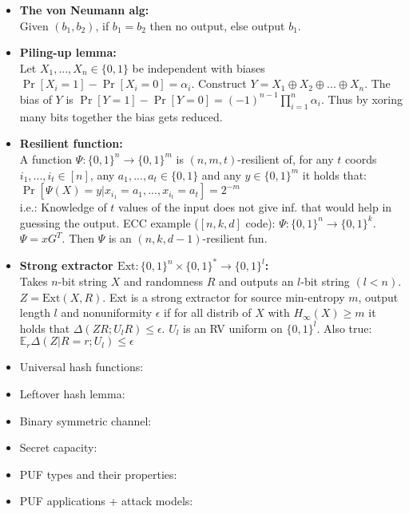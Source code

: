 \documentclass[twocolumn,9pt]{extarticle}
\begin{document}
\begin{itemize}
	\item \textbf{The von Neumann alg: } \\
	Given $(b_1, b_2)$, if $b_1 = b_2$ then no output, else output $b_1$.

	\item \textbf{Piling-up lemma: } \\
	Let $X_1, ..., X_n \in \{0,1\}$ be independent with biases $\Pr[X_i=1]-\Pr[X_i=0]=\alpha_i$. Construct $Y = X_1 \oplus X_2 \oplus ... \oplus X_n$. The bias of $Y$ is $\Pr[Y=1]-\Pr[Y=0] = (-1)^{n-1} \prod_{i=1}^n \alpha_i$. Thus by xoring many bits together the bias gets reduced.

	\item \textbf{Resilient function:} \\
	A function $\Psi : \{0,1\}^n \rightarrow \{0,1\}^m$ is $(n,m,t)$-resilient of, for any $t$ coords $i_1,...,i_t \in [n]$, any $a_1,...,a_t \in \{0,1\}$ and any $y \in \{0,1\}^m$ it holds that: $\Pr[\Psi(X)=y|x_{i_1}=a_1,...,x_{i_t}=a_t] = 2^{-m}$\\
	i.e.: Knowledge of $t$ values of the input does not give inf. that would help in guessing the output. ECC example ($[n,k,d]$ code): $\Psi : \{0,1\}^n \rightarrow \{0,1\}^k$. $\Psi = xG^T$. Then $\Psi$ is an $(n,k,d-1)$-resilient fun.

	\item \textbf{Strong extractor $\text{Ext} : \{0,1\}^n \times \{0,1\}^* \rightarrow \{0,1\}^l$:} \\
	Takes $n$-bit string $X$ and randomness $R$ and outputs an $l$-bit string $(l < n)$. $Z = \text{Ext}(X,R)$. Ext is a strong extractor for source min-entropy $m$, output length $l$ and nonuniformity $\epsilon$ if for all distrib of $X$ with $H_\infty(X) \geq m$ it holds that $\Delta(ZR;U_lR) \leq \epsilon$. $U_l$ is an RV uniform on $\{0,1\}^l$. Also true: $\mathbb{E}_r\Delta(Z|R=r;U_l)\leq\epsilon$


	\item Universal hash functions:

	\item Leftover hash lemma:

	\item Binary symmetric channel:

	\item Secret capacity:

	\item PUF types and their properties:

	\item PUF applications + attack models:


\end{itemize}
\end{document}
